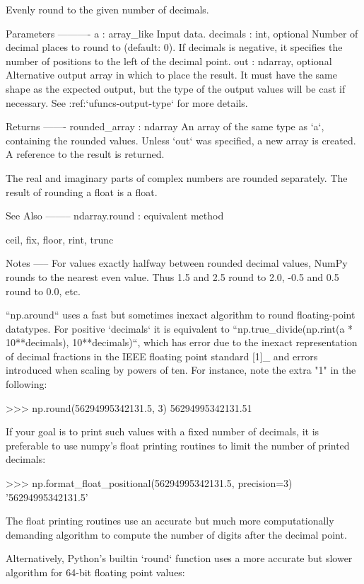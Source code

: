 \begin{DoxyVerb}Evenly round to the given number of decimals.

Parameters
----------
a : array_like
    Input data.
decimals : int, optional
    Number of decimal places to round to (default: 0).  If
    decimals is negative, it specifies the number of positions to
    the left of the decimal point.
out : ndarray, optional
    Alternative output array in which to place the result. It must have
    the same shape as the expected output, but the type of the output
    values will be cast if necessary. See :ref:`ufuncs-output-type` for more
    details.

Returns
-------
rounded_array : ndarray
    An array of the same type as `a`, containing the rounded values.
    Unless `out` was specified, a new array is created.  A reference to
    the result is returned.

    The real and imaginary parts of complex numbers are rounded
    separately.  The result of rounding a float is a float.

See Also
--------
ndarray.round : equivalent method

ceil, fix, floor, rint, trunc


Notes
-----
For values exactly halfway between rounded decimal values, NumPy
rounds to the nearest even value. Thus 1.5 and 2.5 round to 2.0,
-0.5 and 0.5 round to 0.0, etc.

``np.around`` uses a fast but sometimes inexact algorithm to round
floating-point datatypes. For positive `decimals` it is equivalent to
``np.true_divide(np.rint(a * 10**decimals), 10**decimals)``, which has
error due to the inexact representation of decimal fractions in the IEEE
floating point standard [1]_ and errors introduced when scaling by powers
of ten. For instance, note the extra "1" in the following:

    >>> np.round(56294995342131.5, 3)
    56294995342131.51

If your goal is to print such values with a fixed number of decimals, it is
preferable to use numpy's float printing routines to limit the number of
printed decimals:

    >>> np.format_float_positional(56294995342131.5, precision=3)
    '56294995342131.5'

The float printing routines use an accurate but much more computationally
demanding algorithm to compute the number of digits after the decimal
point.

Alternatively, Python's builtin `round` function uses a more accurate
but slower algorithm for 64-bit floating point values:


\end{DoxyVerb}
